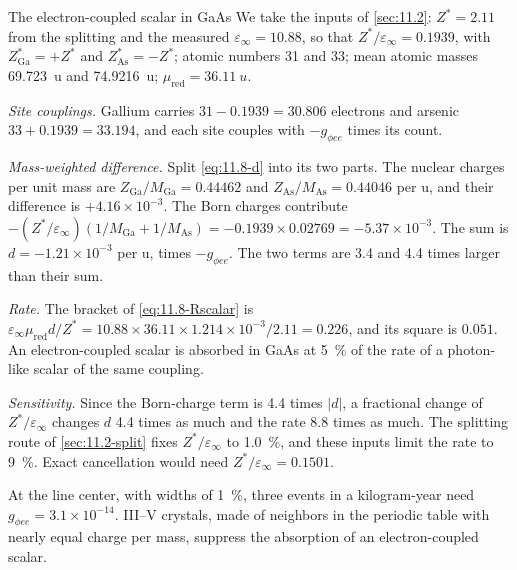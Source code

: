 \begin{workedexample}{The electron-coupled scalar in GaAs}\label{we:11-gaas}
We take the inputs of \cref{sec:11.2}: $Z^* = 2.11$ from the splitting and the measured $\varepsilon_\infty = 10.88$, so that $Z^*/\varepsilon_\infty = 0.1939$, with $Z^*_{\mathrm{Ga}} = +Z^*$ and $Z^*_{\mathrm{As}} = -Z^*$; atomic numbers 31 and 33; mean atomic masses \SI{69.723}{u} and \SI{74.9216}{u}; $\mu_{\mathrm{red}} = \SI{36.11}{u}$.

\emph{Site couplings.} Gallium carries $31 - 0.1939 = 30.806$ electrons and arsenic $33 + 0.1939 = 33.194$, and each site couples with $-g_{\phi ee}$ times its count.

\emph{Mass-weighted difference.} Split \cref{eq:11.8-d} into its two parts. The nuclear charges per unit mass are $Z_{\mathrm{Ga}}/M_{\mathrm{Ga}} = 0.44462$ and $Z_{\mathrm{As}}/M_{\mathrm{As}} = 0.44046$ per u, and their difference is $+4.16\times10^{-3}$. The Born charges contribute $-(Z^*/\varepsilon_\infty)(1/M_{\mathrm{Ga}} + 1/M_{\mathrm{As}}) = -0.1939 \times 0.02769 = -5.37\times10^{-3}$. The sum is $d = -1.21\times10^{-3}$ per u, times $-g_{\phi ee}$. The two terms are 3.4 and 4.4 times larger than their sum.

\emph{Rate.} The bracket of \cref{eq:11.8-Rscalar} is $\varepsilon_\infty\mu_{\mathrm{red}}d/Z^* = 10.88 \times 36.11 \times 1.214\times10^{-3}/2.11 = 0.226$, and its square is $0.051$. An electron-coupled scalar is absorbed in GaAs at \SI{5}{\percent} of the rate of a photon-like scalar of the same coupling.

\emph{Sensitivity.} Since the Born-charge term is 4.4 times $|d|$, a fractional change of $Z^*/\varepsilon_\infty$ changes $d$ 4.4 times as much and the rate 8.8 times as much. The splitting route of \cref{sec:11.2-split} fixes $Z^*/\varepsilon_\infty$ to \SI{1.0}{\percent}, and these inputs limit the rate to \SI{9}{\percent}. Exact cancellation would need $Z^*/\varepsilon_\infty = 0.1501$.
\end{workedexample}

At the line center, with widths of \SI{1}{\percent}, three events in a kilogram-year need $g_{\phi ee} = 3.1\times10^{-14}$. III--V crystals, made of neighbors in the periodic table with nearly equal charge per mass, suppress the absorption of an electron-coupled scalar.

